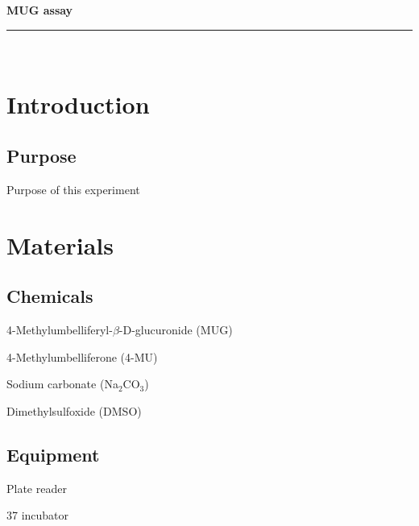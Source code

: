 \documentclass[a4paper,12pt]{article}
\newcommand{\protocol}{MUG assay}
\newcommand{\labtitle}{LAB TITLE}
\newcommand{\authorname}{YOURNAME}
\newenvironment{packed_enum}{
\begin{enumerate}
  \setlength{\itemsep}{1pt}
  \setlength{\parskip}{0pt}
  \setlength{\parsep}{0pt}
}{\end{enumerate}}
\begin{document}
 
 
 
\begin{titlepage}
\begin{center}
{\LARGE \textbf{\protocol} \\ \vspace{4pt}}
\rule[13pt]{\textwidth}{1pt} \\ \vspace{150pt}
\end{center}
 
\end{titlepage}
 
\newpage
\thispagestyle{empty}           %
\tableofcontents
\clearpage                      %
 
\setcounter{page}{1}
 
\section{Introduction}
	\subsection{Purpose}
		Purpose of this experiment
\section{Materials}
	\subsection{Chemicals}
	\begin{packed_enum}
	\item 4-Methylumbelliferyl-{$\beta$}-D-glucuronide (MUG)
	\item 4-Methylumbelliferone (4-MU)
	\item Sodium carbonate (Na$_{2}$CO$_{3}$)
	\item Dimethylsulfoxide (DMSO)
	\end{packed_enum}
		
	\subsection{Equipment}
	\begin{packed_enum}
	\item Plate reader
	\item 37 {\textcelsius} incubator
	\end{packed_enum}
 
\end{document}
